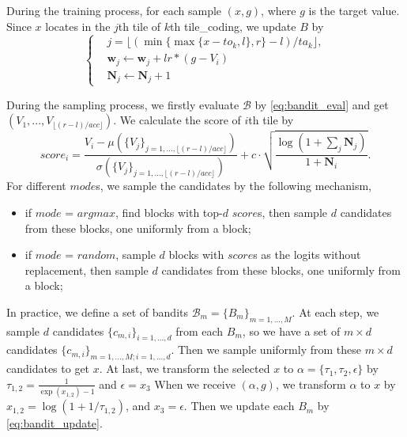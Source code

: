During the training process, for each sample $(x, g)$, where $g$ is the target value. Since $x$ locates in the $j$th tile of $k$th tile\_coding, we update $B$ by
\begin{equation}
\label{eq:bandit_update}
\left\{
\begin{aligned}
&j = \lfloor (\min\{\max\{x-to_{k}, l\}, r\} - l) / ta_{k} \rfloor, \\
&\textbf{w}_j 
\leftarrow \textbf{w}_j + lr * \left(g - V_i\right)\\
& \textbf{N}_j \leftarrow \textbf{N}_j + 1
\end{aligned}
\right.
\end{equation}

During the sampling process, we firstly evaluate $\mathcal{B}$ by \eqref{eq:bandit_eval} and get $(V_1, ..., V_{\lfloor (r-l) / acc \rfloor})$.
We calculate the score of $i$th tile by
\begin{equation}
\label{eq:bandit_score}
score_i = \frac{V_i - \mu(\{V_j\}_{j=1,...,\lfloor(r-l)/acc\rfloor})}{\sigma(\{V_j\}_{j=1,...,\lfloor(r-l)/acc\rfloor})} + c \cdot \sqrt{\frac{\log (1 + \sum_j \textbf{N}_j)}{1 + \textbf{N}_i}}.
\end{equation}
For different $mode$s, we sample the candidates by the following mechanism,
\begin{itemize}
    \item if $mode$ = $argmax$, find blocks with top-$d$ $score$s, then sample $d$ candidates from these blocks, one uniformly from a block;
    \item if $mode$ = $random$, sample $d$ blocks with $score$s as the logits without replacement, then sample $d$ candidates from these blocks, one uniformly from a block;
\end{itemize}

In practice, we define a set of bandits $\mathcal{B}_m = \{B_m\}_{m=1,...,M}$.
At each step, we sample $d$ candidates $\{c_{m, i}\}_{i=1,...,d}$ from each $B_m$, so we have a set of $m \times d$ candidates $\{c_{m, i}\}_{m=1,...,M; i=1,...,d}$.
Then we sample uniformly from these $m \times d$ candidates to get $x$. 
At last, we transform the selected $x$ to $\alpha=\{\tau_1,\tau_2,\epsilon\}$ by $\tau_{1,2} = \frac{1}{\exp (x_{1,2}) - 1}$ and $\epsilon = x_{3}$
When we receive $(\alpha, g)$, we transform $\alpha$ to $x$ by $x_{1,2} = \log (1 + 1 / \tau_{1,2})$, and  $x_{3} = \epsilon$.
Then we update each $B_m$ by \eqref{eq:bandit_update}.




